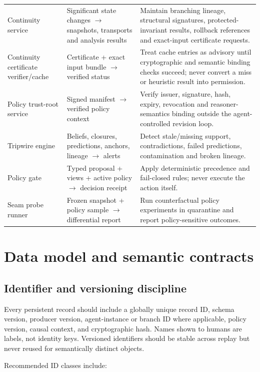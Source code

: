 \documentclass[11pt,oneside]{report}
\begin{document}
\begin{longtable}{@{}L{1.50in}L{1.90in}L{3.05in}@{}}
Continuity service & Significant state changes $\rightarrow$ snapshots, transports and analysis results & Maintain branching lineage, structural signatures, protected-invariant results, rollback references and exact-input certificate requests. \\
Continuity certificate verifier/cache & Certificate + exact input bundle $\rightarrow$ verified status & Treat cache entries as advisory until cryptographic and semantic binding checks succeed; never convert a miss or heuristic result into permission. \\
Policy trust-root service & Signed manifest $\rightarrow$ verified policy context & Verify issuer, signature, hash, expiry, revocation and reasoner-semantics binding outside the agent-controlled revision loop. \\
Tripwire engine & Beliefs, closures, predictions, anchors, lineage $\rightarrow$ alerts & Detect stale/missing support, contradictions, failed predictions, contamination and broken lineage. \\
Policy gate & Typed proposal + views + active policy $\rightarrow$ decision receipt & Apply deterministic precedence and fail-closed rules; never execute the action itself. \\
Seam probe runner & Frozen snapshot + policy sample $\rightarrow$ differential report & Run counterfactual policy experiments in quarantine and report policy-sensitive outcomes. \\
\bottomrule
\end{longtable}

\chapter{Data model and semantic contracts}

\section{Identifier and versioning discipline}

Every persistent record should include a globally unique record ID, schema version, producer version, agent-instance or branch ID where applicable, policy version, causal context, and cryptographic hash. Names shown to humans are labels, not identity keys. Versioned identifiers should be stable across replay but never reused for semantically distinct objects.

Recommended ID classes include:
\end{document}
